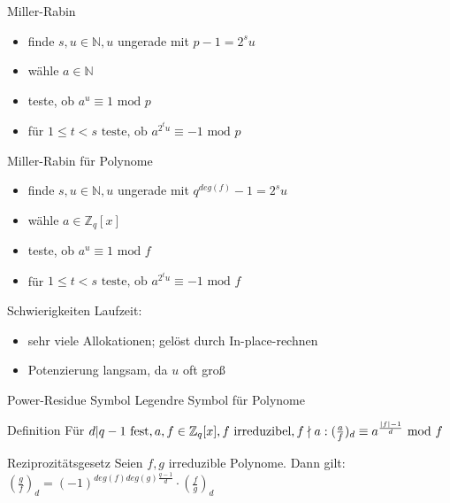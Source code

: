 \documentclass[german,10pt,xcolor=colortbl,compress]{beamer}%
\newcommand{\ZZ}{\mathbb{Z}}
\newcommand{\NN}{\mathbb{N}}
\begin{document}
	\begin{frame}{Miller-Rabin}
		\begin{itemize}
			\item finde $s,u \in \NN,u $ ungerade mit $p-1=2^su $
			\item wähle $a \in \NN$ 
			\item teste, ob $a^u \equiv 1 \text{ mod } p$
			\item für $1\leq t < s \text{ teste, ob } a^{2^t u} \equiv -1 \text{ mod } p$
		\end{itemize}
	\end{frame}


	\begin{frame}{Miller-Rabin für Polynome}
		\begin{itemize}
			\item finde $s,u \in \NN,u $ ungerade mit $q^{deg(f)}-1=2^su $
			\item wähle $a \in \ZZ_q[x]$ 
			\item teste, ob $a^u \equiv 1 \text{ mod } f$
			\item für $1\leq t < s \text{ teste, ob } a^{2^t u} \equiv -1 \text{ mod } f$	
		\end{itemize}		
	\end{frame}


	\begin{frame}{Schwierigkeiten}
		Laufzeit: 
		
		\begin{itemize}
			\item sehr viele Allokationen; gelöst durch In-place-rechnen
			\item Potenzierung langsam, da $u$ oft groß
		\end{itemize}
	\end{frame}


	\begin{frame}{Power-Residue Symbol}
		Legendre Symbol für Polynome 
		\begin{block}{Definition}
			Für $d|q-1 \text{ fest},  a,f \in \ZZ_q[x], f \text{ irreduzibel}, f \nmid a: 
			\newline 	
			(\frac{a}{f})_d  \equiv a^{\frac{|f|-1}{d}} \text{ mod } f$
		\end{block}
	
		\begin{block}{Reziprozitätsgesetz}
			Seien $f,g$ irreduzible Polynome. Dann gilt:
			$(\frac{g}{f})_d=(-1)^{deg(f)deg(g)\frac{q-1}{d}} \cdot (\frac{f}{g})_d $ 				
		\end{block}
	\end{frame}
\end{document}
